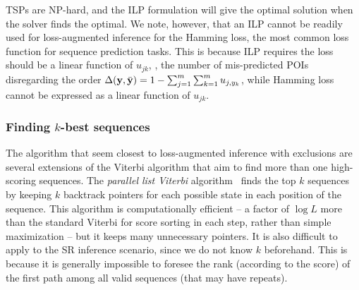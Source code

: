 TSPs are NP-hard,
and the ILP formulation will give the optimal solution when the solver finds the optimal.
We note, however, that an ILP cannot be readily used for loss-augmented inference
for the Hamming loss, the most common loss function for sequence prediction tasks.
This is because ILP requires the loss should be a linear function of $u_{jk}$,
\eg, the number of mis-predicted POIs disregarding the order $\Delta(\mathbf{y}, \bar{\mathbf{y}}) = 1 - \sum_{j=1}^m \sum_{k=1}^m u_{j, y_k}$,
while Hamming loss cannot be expressed as a linear function of $u_{jk}$.

\subsubsection{Finding $k$-best sequences}

The algorithm that seem closest to loss-augmented inference with exclusions are several extensions
of the Viterbi algorithm that aim to find more than one high-scoring sequences.
The \emph{parallel list Viterbi} algorithm~\cite{seshadri1994list} finds the top $k$ sequences
by keeping $k$ backtrack pointers for each possible state in each position of the sequence.
This algorithm is computationally efficient
-- a factor of $\log L$ more than the standard Viterbi for score sorting in each step, rather than simple maximization
-- but it keeps many unnecessary pointers. It is also difficult to apply to the SR inference scenario,
since we do not know $k$ beforehand. This is because it is generally impossible to foresee
the rank (according to the score) of the first path among all valid sequences (that may have repeats).

